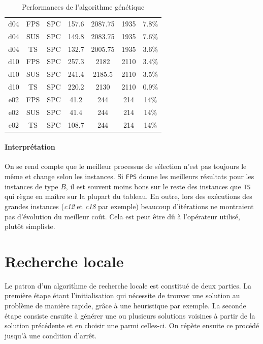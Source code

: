 \documentclass[10pt]{article}
\begin{document}
\begin{table}[h!]
\begin{tabular}{|c|c|c|c|c|c|c|}
\hline
d04 & FPS & SPC & 157.6 & 2087.75 & 1935 & 7.8\% \\
d04 & SUS & SPC & 149.8 & 2083.75 & 1935 & 7.6\% \\
\rowcolor{yellow!60} d04 & TS & SPC & 132.7 & 2005.75 & 1935 & 3.6\% \\
\hline
d10 & FPS & SPC & 257.3 & 2182 & 2110 & 3.4\% \\
d10 & SUS & SPC & 241.4 & 2185.5 & 2110 & 3.5\% \\
\rowcolor{yellow!60} d10 & TS & SPC & 220.2 & 2130 & 2110 & 0.9\% \\
\hline
e02 & FPS & SPC & 41.2 & 244 & 214 & 14\% \\
e02 & SUS & SPC & 41.4 & 244 & 214 & 14\% \\
e02 & TS & SPC & 108.7 & 244 & 214 & 14\% \\
\hline
		\end{tabular}
		\caption{Performances de l'algorithme génétique}
		\label{tab-perfgen}
	\end{table}
	
	\paragraph{Interprétation}{
	 On se rend compte que le meilleur processus de sélection n'est pas toujours le même et change selon les instances. Si \texttt{FPS} donne les meilleurs résultats pour les instances de type $B$, il est souvent moins bons sur le reste des instances que \texttt{TS} qui règne en maître sur la plupart du tableau. En outre, lors des exécutions des grandes instances (\textit{c12} et \textit{c18} par exemple) beaucoup d'itérations ne montraient pas d'évolution du meilleur coût. Cela est peut être dû à l'opérateur utilisé, plutôt simpliste.
	}
	
	
\section{Recherche locale}

Le patron d'un algorithme de recherche locale est constitué de deux parties. La première étape étant l'initialisation qui nécessite de trouver une solution au problème de manière rapide, grâce à une heuristique par exemple. La seconde étape consiste ensuite à générer une ou plusieurs solutions voisines à partir de la solution précédente et en choisir une parmi celles-ci. On répète ensuite ce procédé jusqu'à une condition d'arrêt.
\end{document}

